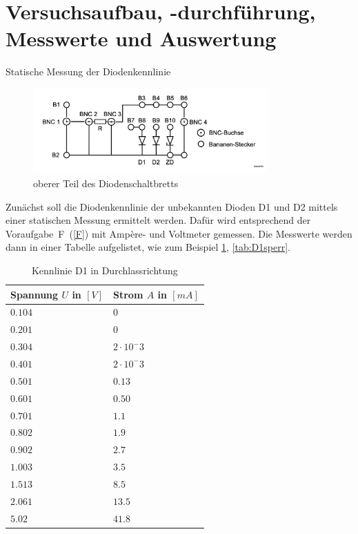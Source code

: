 \documentclass{article}
\theoremstyle{definition}
\begin{document}
\section{Versuchsaufbau, -durchführung, Messwerte und Auswertung}
\begin{aufgabe}{Statische Messung der Diodenkennlinie} 
    \aufbau
    \begin{figure}[H]
        \centering
        \includegraphics[width=0.8\textwidth]{figs/fig2_6.png}
        \caption{oberer Teil des Diodenschaltbretts\cite{anleitung}}
        \label{aufbau_2_1}
    \end{figure}
Zunächst soll die Diodenkennlinie der unbekannten Dioden D1 und D2 mittels einer statischen Messung ermittelt werden.
 Dafür wird entsprechend der Voraufgabe~F~(\ref{F}) mit Ampère- und Voltmeter gemessen. Die Messwerte werden dann in einer 
 Tabelle aufgelistet, wie zum Beispiel \ref{tab:D1duchlass}, \ref{tab:D1sperr}. 

\begin{table}[h!]
    \centering
    \begin{tabular}{|l|l|}
    \hline
    \textbf{Spannung $U$ in $[V]$} & \textbf{Strom $A$ in $[mA]$} \\
    \hline
    $0.104$ & $0$ \\
    $0.201$ & $0$\\
    $0.304$ &  $2 \cdot 10^-3$ \\
    $0.401$ & $2 \cdot 10^-3$\\
    $0.501$ & $0.13$ \\
    $0.601$ & $0.50$ \\
    $0.701$ & $1.1$ \\
    $0.802$ & $1.9$ \\
    $0.902$ & $2.7$ \\
    $1.003$ & $3.5$ \\
    $1.513$ & $8.5$ \\
    $2.061$ & $13.5$ \\
    $5.02$ & $41.8$ \\
    \hline
    \end{tabular}
    \caption{Kennlinie D1 in Durchlassrichtung}
    \label{tab:D1duchlass}
    \end{table}
    

\end{aufgabe}
\end{document}

